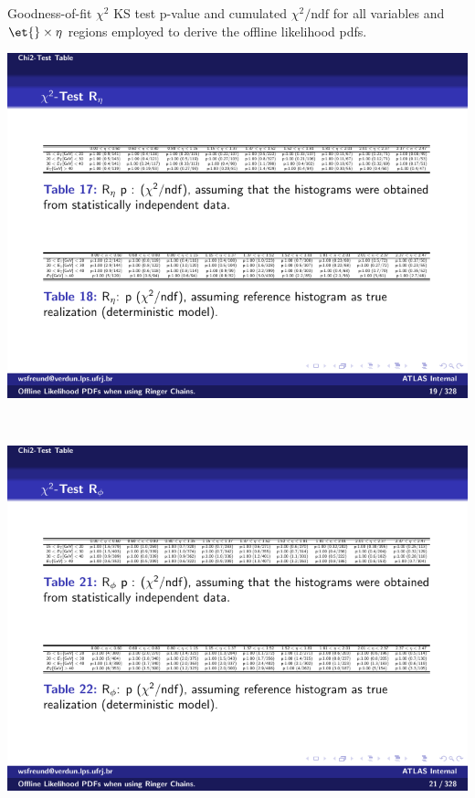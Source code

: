 \begin{table}[p]
\centering
\caption{\label{tab:gof_chi2_p_values}Goodness-of-fit $\chi^2$
KS test p-value and cumulated $\chi^2/\text{ndf}$ for all variables and
$\et{}\times\eta{}$ regions employed to derive the offline likelihood pdfs.}
\begin{subtable}{\textwidth}
\caption{\reta{}\label{tab:gof_chi2_p_values_reta}}
\includegraphics[width=\textwidth]{appendices/figures/gof/reta_chi2_table.pdf}
\end{subtable} \\
\begin{subtable}{\textwidth}
\caption{\rphi{}\label{tab:gof_chi2_p_values_rphi}}
\includegraphics[width=\textwidth]{appendices/figures/gof/rphi_chi2_table.pdf}

\end{subtable}
\end{table}
